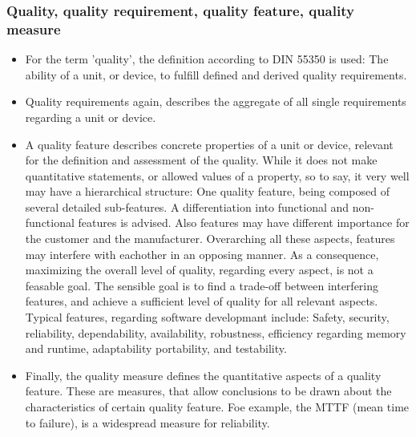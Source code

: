 	\subsubsection{Quality, quality requirement, quality feature, quality measure}
		\begin{itemize}
		\item For the term 'quality', the definition according to DIN 55350 is used: The ability of a unit, or device, to fulfill defined and derived quality requirements.
		\item Quality requirements again, describes the aggregate of all single requirements regarding a unit or device.
		\item A quality feature describes concrete properties of a unit or device, relevant for the definition and assessment of the quality. While it does not make quantitative statements, or allowed values of a property, so to say, it very well may have a hierarchical structure: One quality feature, being composed of several detailed sub-features. A differentiation into functional and non-functional features is advised. Also features may have different importance for the customer and the manufacturer. Overarching all these aspects, features may interfere with eachother in an opposing manner. As a consequence, maximizing the overall level of quality, regarding every aspect, is not a feasable goal. The sensible goal is to find a trade-off between interfering features, and achieve a sufficient level of quality for all relevant aspects. Typical features, regarding software developmant include: Safety, security, reliability, dependability, availability, robustness, efficiency regarding memory and runtime, adaptability portability, and testability.
		\item Finally, the quality measure defines the quantitative aspects of a quality feature. These are measures, that allow conclusions to be drawn about the characteristics of certain quality feature. Foe example, the  MTTF (mean time to failure), is a widespread measure for reliability.
		\end{itemize}


